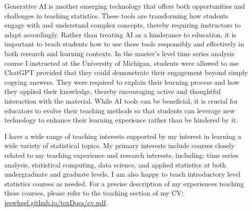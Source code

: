 \documentclass{article}
\begin{document}
Generative AI is another emerging technology that offers both opportunities and challenges in teaching statistics.
These tools are transforming how students engage with and understand complex concepts, thereby requiring instructors to adapt accordingly.
Rather than treating AI as a hinderance to education, it is important to teach students how to use these tools responsibly and effectively in both research and learning contexts.
In the master's level time series analysis course I instructed at the University of Michigan, students were allowed to use ChatGPT provided that they could demonstrate their engagement beyond simply copying answers.
They were required to explain their learning process and how they applied their knowledge, thereby encouraging active and thoughtful interaction with the material.
While AI tools can be beneficial, it is crucial for educators to evolve their teaching methods so that students can leverage new technology to enhance their learning experience rather than be hindered by it.

I have a wide range of teaching interests supported by my interest in learning a wide variety of statistical topics.
My primary interests include courses closely related to my teaching experience and research interests, including: time series analysis, statistical computing, data science, and applied statistics at both undergraduate and graduate levels.
I am also happy to teach introductory level statistics courses as needed.
For a precise description of my experiences teaching these courses, please refer to the teaching section of my CV: \href{https://jeswheel.github.io/texDocs/cv.pdf}{jeswheel.github.io/texDocs/cv.pdf}.



\end{document}
